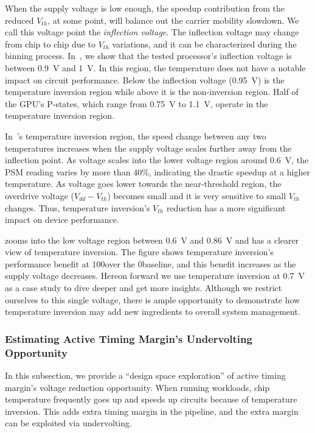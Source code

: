 When the supply voltage is low enough, the speedup contribution from the reduced $V_{th}$, at some point, will balance out the carrier mobility slowdown. We call this voltage point the {\it inflection voltage}. The inflection voltage may change from chip to chip due to $V_{th}$ variations, and it can be characterized during the binning process. In~, we show that the tested processor's inflection voltage is between 0.9~V and 1~V. In this region, the temperature does not have a notable impact on circuit performance. Below the inflection voltage (0.95~V) is the temperature inversion region while above it is the non-inversion region. Half of the GPU's P-states, which range from 0.75~V to 1.1~V, operate in the temperature inversion region.

In~'s temperature inversion region, the speed change between any two temperatures increases when the supply voltage scales further away from the inflection point. As voltage scales into the lower voltage region around 0.6~V, the PSM reading varies by more than 40\%, indicating the drastic speedup at a higher temperature. As voltage goes lower towards the near-threshold region, the overdrive voltage ($V_{dd}-V_{th}$) becomes small and it is very sensitive to small $V_{th}$ changes. Thus, temperature inversion's $V_{th}$ reduction has a more significant impact on device performance.

 zooms into the low voltage region between 0.6~V and 0.86~V and has a clearer view of temperature inversion. The figure shows temperature inversion's performance benefit at 100\C over the 0\C baseline, and this benefit increases as the supply voltage decreases. Hereon forward we use temperature inversion at 0.7~V as a case study to dive deeper and get more insights. Although we restrict ourselves to this single voltage, there is ample opportunity to demonstrate how temperature inversion may add new ingredients to overall system management.

\subsubsection{Estimating Active Timing Margin's Undervolting Opportunity}
\label{sec:tistate:characterize:extrapolate}

In this subsection, we provide a ``design space exploration'' of active timing margin's voltage reduction opportunity. When running workloads, chip temperature frequently goes up and speeds up circuits because of temperature inversion. This adds extra timing margin in the pipeline, and the extra margin can be exploited via undervolting. 

